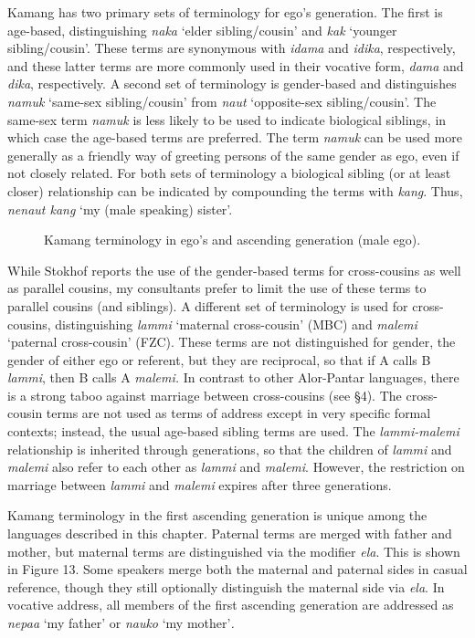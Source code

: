 Kamang has two primary sets of terminology for ego's generation. The first is age-based, distinguishing \textit{naka} `elder sibling/cousin' and \textit{kak} `younger sibling/cousin'. These terms are synonymous with \textit{idama} and \textit{idika}, respectively, and these latter terms are more commonly used in their vocative form, \textit{dama} and \textit{dika}, respectively. A second set of terminology is gender-based and distinguishes \textit{namuk} `same-sex sibling/cousin' from \textit{naut} `opposite-sex sibling/cousin'. The same-sex term \textit{namuk} is less likely to be used to indicate biological siblings, in which case the age-based terms are preferred. The term \textit{namuk} can be used more generally as a friendly way of greeting persons of the same gender as ego, even if not closely related. For both sets of terminology a biological sibling (or at least closer) relationship can be indicated by compounding the terms with \textit{kang}. Thus, \textit{nenaut kang} `my (male speaking) sister'.


\begin{figure}
\caption{Kamang terminology in ego's and ascending generation (male ego). }
\end{figure}



While Stokhof reports the use of the gender-based terms for cross-cousins as well as parallel cousins, my consultants prefer to limit the use of these terms to parallel cousins (and siblings). A different set of terminology is used for cross-cousins, distinguishing \textit{lammi} `maternal cross-cousin' (MBC) and \textit{malemi} `paternal cross-cousin' (FZC). These terms are not distinguished for gender, the gender of either ego or referent, but they are reciprocal, so that if A calls B \textit{lammi}, then B calls A \textit{malemi.} In contrast to other Alor-Pantar languages, there is a strong taboo against marriage between cross-cousins (see {\S}4). The cross-cousin terms are not used as terms of address except in very specific formal contexts; instead, the usual age-based sibling terms are used. The \textit{lammi-malemi} relationship is inherited through generations, so that the children of \textit{lammi} and \textit{malemi} also refer to each other as \textit{lammi} and \textit{malemi}. However, the restriction on marriage between \textit{lammi} and \textit{malemi} expires after three generations.

Kamang terminology in the first ascending generation is unique among the languages described in this chapter. Paternal terms are merged with father and mother, but maternal terms are distinguished via the modifier \textit{ela}. This is shown in Figure 13. Some speakers merge both the maternal and paternal sides in casual reference, though they still optionally distinguish the maternal side via \textit{ela}. In vocative address, all members of the first ascending generation are addressed as \textit{nepaa} `my father'\textit{} or \textit{nauko} `my mother'\textit{.}

